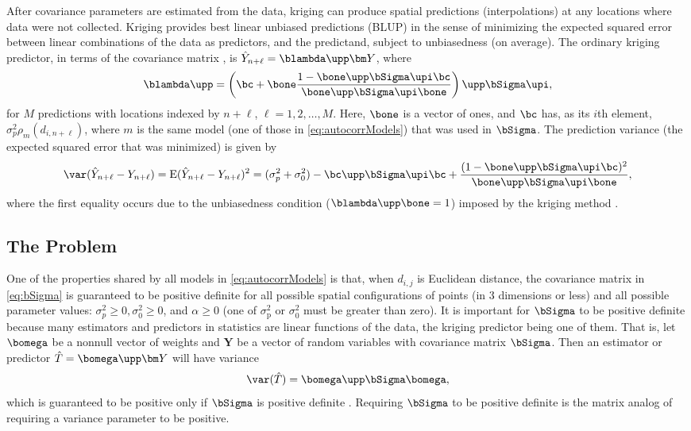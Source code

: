 After covariance parameters are estimated from the data, kriging can produce spatial predictions (interpolations) at any locations where data were not collected.  Kriging provides best linear unbiased predictions (BLUP) in the sense of minimizing the expected squared error between linear combinations of the data as predictors, and the predictand, subject to unbiasedness (on average). The ordinary kriging predictor, in terms of the covariance matrix \citep[][p.33]{Scha:Gotw:stat:2005}, is $\hat{Y}_{n+\ell} =\blambda\upp\bm Y$, where
\begin{equation} \label{eq:OK}
	\blambda\upp = \left(\bc + \bone\frac{1 - \bone\upp\bSigma\upi\bc}{\bone\upp\bSigma\upi\bone}\right)\upp\bSigma\upi, 
\end{equation}
for $M$ predictions with locations indexed by $n+\ell$, $\ell = 1,2,\ldots,M$. Here, $\bone$ is a vector of ones, and $\bc$ has, as its $i$th element, $\sigma^2_p\rho_m(d_{i,n+\ell})$, where $m$ is the same model (one of those in \ref{eq:autocorrModels}) that was used in $\bSigma$. The prediction variance (the expected squared error that was minimized) is given by
\begin{equation} \label{eq:OKse}
	\var(\hat{Y}_{n+\ell} - Y_{n+\ell}) = \textrm{E}(\hat{Y}_{n+\ell} - Y_{n+\ell})^2 = (\sigma^2_p + \sigma^2_0) - \bc\upp\bSigma\upi\bc + \frac{(1 - \bone\upp\bSigma\upi\bc)^2}{\bone\upp\bSigma\upi\bone},
\end{equation}
where the first equality occurs due to the unbiasedness condition ($\blambda\upp\bone = 1$) imposed by the kriging method \citep[e.g.,][p. 120-121]{Cres:stat:1993}.

\subsection*{The Problem}

One of the properties shared by all models in \ref{eq:autocorrModels} is that, when $d_{i,j}$ is Euclidean distance, the covariance matrix in \ref{eq:bSigma} is guaranteed to be positive definite for all possible spatial configurations of points (in 3 dimensions or less) and all possible parameter values:  $\sigma^2_p \ge 0, \sigma^2_0 \ge 0$, and $\alpha \ge 0$ (one of $\sigma^2_\textrm{p}$ or $\sigma^2_0$ must be greater than zero). It is important for $\bSigma$ to be positive definite because many estimators and predictors in statistics are linear functions of the data, the kriging predictor being one of them.  That is, let $\bomega$ be a nonnull vector of weights and $\bm Y$ be a vector of random variables with covariance matrix $\bSigma$.  Then an estimator or predictor $\hat{T} = \bomega\upp\bm Y$ will have variance
\begin{equation} \label{eq:quadForm}
  \var(\hat{T}) = \bomega\upp\bSigma\bomega,
\end{equation}
which is guaranteed to be positive only if $\bSigma$ is positive definite \citep{Guil:Schi:Porc:Bevi:vali:2014}.  Requiring $\bSigma$ to be positive definite is the matrix analog of requiring a variance parameter to be positive.  

